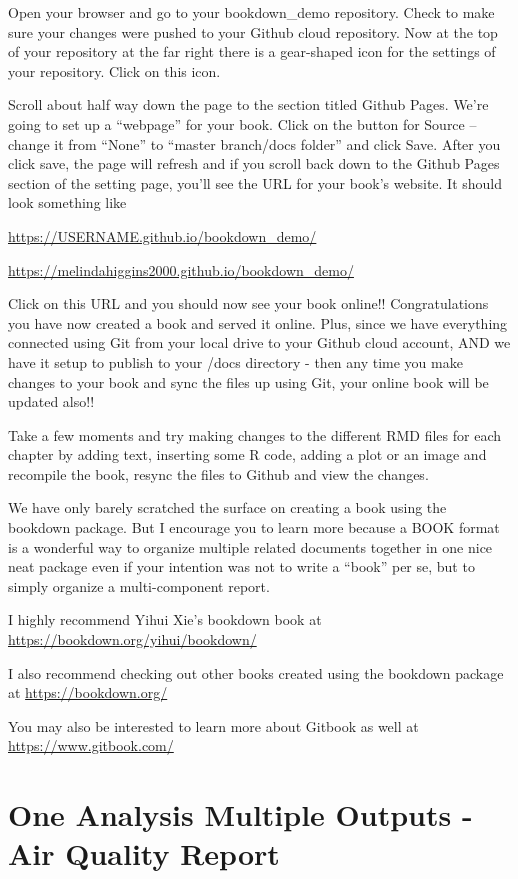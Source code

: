 \documentclass[
]{book}
\begin{document}
Open your browser and go to your bookdown\_demo repository. Check to make sure your changes were pushed to your Github cloud repository. Now at the top of your repository at the far right there is a gear-shaped icon for the settings of your repository. Click on this icon.

Scroll about half way down the page to the section titled Github Pages. We're going to set up a ``webpage'' for your book. Click on the button for Source -- change it from ``None'' to ``master branch/docs folder'' and click Save. After you click save, the page will refresh and if you scroll back down to the Github Pages section of the setting page, you'll see the URL for your book's website. It should look something like

\url{https://USERNAME.github.io/bookdown_demo/}

\url{https://melindahiggins2000.github.io/bookdown_demo/}

Click on this URL and you should now see your book online!! Congratulations you have now created a book and served it online. Plus, since we have everything connected using Git from your local drive to your Github cloud account, AND we have it setup to publish to your /docs directory - then any time you make changes to your book and sync the files up using Git, your online book will be updated also!!

Take a few moments and try making changes to the different RMD files for each chapter by adding text, inserting some R code, adding a plot or an image and recompile the book, resync the files to Github and view the changes.

We have only barely scratched the surface on creating a book using the bookdown package. But I encourage you to learn more because a BOOK format is a wonderful way to organize multiple related documents together in one nice neat package even if your intention was not to write a ``book'' per se, but to simply organize a multi-component report.

I highly recommend Yihui Xie's bookdown book at \url{https://bookdown.org/yihui/bookdown/}

I also recommend checking out other books created using the bookdown package at \url{https://bookdown.org/}

You may also be interested to learn more about Gitbook as well at \url{https://www.gitbook.com/}

\hypertarget{airqualex}{%
\chapter{One Analysis Multiple Outputs - Air Quality Report}\label{airqualex}}
\end{document}
